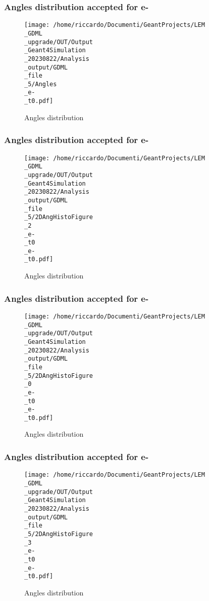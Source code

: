 \documentclass[8pt]{beamer}
\begin{document}
            \begin{frame}
                \frametitle{Angles distribution accepted for e-}
            
        \begin{figure}[h]
            \centering
            \texttt{[image: /home/riccardo/Documenti/GeantProjects/LEM\\\_GDML\\\_upgrade/OUT/Output\\\_Geant4Simulation\\\_20230822/Analysis\\\_output/GDML\\\_file\\\_5/Angles\\\_e-\\\_t0.pdf]}
            \caption{Angles distribution}
        \end{figure}
        
            \end{frame}
            
            \begin{frame}
                \frametitle{Angles distribution accepted for e-}
            
        \begin{figure}[h]
            \centering
            \texttt{[image: /home/riccardo/Documenti/GeantProjects/LEM\\\_GDML\\\_upgrade/OUT/Output\\\_Geant4Simulation\\\_20230822/Analysis\\\_output/GDML\\\_file\\\_5/2DAngHistoFigure\\\_2\\\_e-\\\_t0\\\_e-\\\_t0.pdf]}
            \caption{Angles distribution}
        \end{figure}
        
            \end{frame}
            
            \begin{frame}
                \frametitle{Angles distribution accepted for e-}
            
        \begin{figure}[h]
            \centering
            \texttt{[image: /home/riccardo/Documenti/GeantProjects/LEM\\\_GDML\\\_upgrade/OUT/Output\\\_Geant4Simulation\\\_20230822/Analysis\\\_output/GDML\\\_file\\\_5/2DAngHistoFigure\\\_0\\\_e-\\\_t0\\\_e-\\\_t0.pdf]}
            \caption{Angles distribution}
        \end{figure}
        
            \end{frame}
            
            \begin{frame}
                \frametitle{Angles distribution accepted for e-}
            
        \begin{figure}[h]
            \centering
            \texttt{[image: /home/riccardo/Documenti/GeantProjects/LEM\\\_GDML\\\_upgrade/OUT/Output\\\_Geant4Simulation\\\_20230822/Analysis\\\_output/GDML\\\_file\\\_5/2DAngHistoFigure\\\_3\\\_e-\\\_t0\\\_e-\\\_t0.pdf]}
            \caption{Angles distribution}
        \end{figure}
        
            \end{frame}
            
\end{document}
